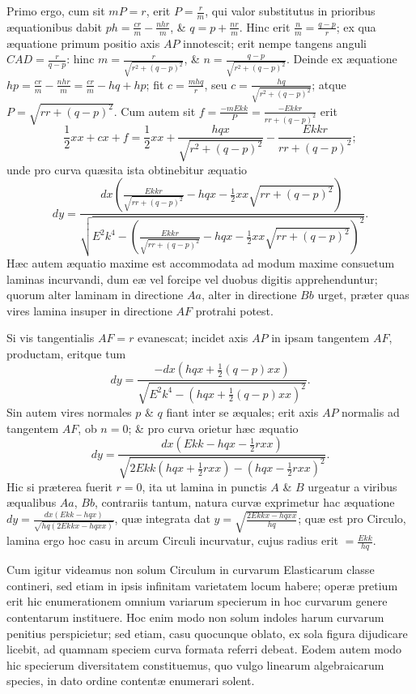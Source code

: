 Primo ergo, cum sit $mP=r$, erit $P=\frac rm$, qui valor substitutus in prioribus æquationibus dabit $ph=\frac{cr}m-\frac{nhr}m$, \& $q=p+\frac{nr}m$. Hinc erit $\frac nm=\frac{q-p}r$; ex qua æquatione primum positio axis $AP$ innotescit; erit nempe tangens anguli $CAD=\frac r{q-p}$: hinc $m=\frac r{\sqrt{r^2+(q-p)^2}}$, \& $n=\frac{q-p}{\sqrt{r^2+(q-p)^2}}$. Deinde ex æquatione $hp=\frac{cr}m-\frac{nhr}m=\frac{cr}m-hq+hp$; fit $c=\frac{mhq}r$, seu $c=\frac{hq}{\sqrt{r^2+(q-p)^2}}$; atque $P=\sqrt{rr+(q-p)^2}$. Cum autem sit $f=\frac{-mEkk}P=\frac{-Ekkr}{rr+(q-p)^2}$ erit
\[\frac12xx+cx+f=\frac12xx+\frac{hqx}{\sqrt{r^2+(q-p)^2}}-\frac{Ekkr}{rr+(q-p)^2};\]
unde pro curva quæsita ista obtinebitur æquatio
\[dy=\frac{dx\left(\frac{Ekkr}{\sqrt{rr+(q-p)^2}}-hqx-\frac12xx\sqrt{rr+(q-p)^2}\right)}{\sqrt{E^2k^4-\left(\frac{Ekkr}{\sqrt{rr+(q-p)^2}}-hqx-\frac12xx\sqrt{rr+(q-p)^2}\right)^2}}.\]
Hæc autem æquatio maxime est accommodata ad modum maxime
consuetum laminas incurvandi, dum eæ vel forcipe vel duobus digitis apprehenduntur; quorum alter laminam in directione $Aa$, alter in directione $Bb$ urget, præter quas vires lamina insuper in directione $AF$ protrahi potest.

Si vis tangentialis $AF=r$ evanescat; incidet axis $AP$ in ipsam tangentem $AF$, productam, eritque tum
\[dy=\frac{-dx(hqx+\frac12(q-p)xx)}{\sqrt{E^2k^4-(hqx+\frac12(q-p)xx)^2}}.\]
Sin autem vires normales $p$ \& $q$ fiant inter se æquales; erit axis $AP$ normalis ad tangentem $AF$, ob $n=0$; \& pro curva orietur hæc æquatio
\[dy=\frac{dx(Ekk-hqx-\frac12rxx)}{\sqrt{2Ekk(hqx+\frac12rxx)-(hqx-\frac12rxx)^2}}.\]
Hic si præterea fuerit $r=0$, ita ut lamina in punctis $A$ \& $B$ urgeatur a viribus æqualibus $Aa$, $Bb$, contrariis tantum, natura curvæ exprimetur hac æquatione $dy=\frac{dx(Ekk-hqx)}{\sqrt{hq(2Ekkx-hqxx)}}$, quæ integrata dat $y=\sqrt{\frac{2Ekkx-hqxx}{hq}}$; quæ est pro Circulo, lamina ergo hoc casu in arcum Circuli incurvatur, cujus radius erit $=\frac{Ekk}{hq}$.

Cum igitur videamus non solum Circulum in curvarum Elasticarum classe contineri, sed etiam in ipsis infinitam varietatem locum habere; operæ pretium erit hic enumerationem omnium variarum specierum in hoc curvarum genere contentarum instituere. Hoc enim modo non solum indoles harum curvarum penitius perspicietur; sed etiam, casu quocunque oblato, ex sola figura dijudicare licebit, ad quamnam speciem curva formata referri debeat. Eodem autem modo hic specierum diversitatem constituemus, quo vulgo linearum algebraicarum species, in dato ordine contentæ enumerari solent.

